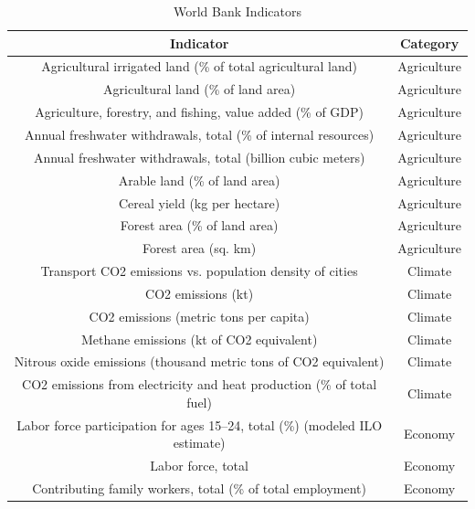     \begin{longtable}{||c|c||}
        \caption{World Bank Indicators}
        \label{tab:WDI Indicators}
        \\\hline
        \textbf{Indicator} & \textbf{Category} \\


        \hline
            Agricultural irrigated land (\% of total agricultural land)
 & Agriculture 
\\
        \hline
            Agricultural land (\% of land area)
 & Agriculture 
\\
        \hline
            Agriculture, forestry, and fishing, value added (\% of GDP) & Agriculture\\
        \hline
            Annual freshwater withdrawals, total (\% of internal resources) & Agriculture \\
        \hline
            Annual freshwater withdrawals, total (billion cubic meters) & Agriculture \\
        \hline
            Arable land (\% of land area)  & Agriculture\\
        \hline
            Cereal yield (kg per hectare) & Agriculture \\
        \hline
            Forest area (\% of land area) & Agriculture \\
        \hline
            Forest area (sq. km) & Agriculture \\
        \hline
            Transport CO2 emissions vs. population density of cities & Climate \\
        \hline
            CO2 emissions (kt) & Climate \\
        \hline
            CO2 emissions (metric tons per capita) & Climate \\
        \hline
            Methane emissions (kt of CO2 equivalent) & Climate\\
        \hline
            Nitrous oxide emissions (thousand metric tons of CO2 equivalent) & Climate \\
        \hline
            CO2 emissions from electricity and heat production (\% of total fuel) & Climate \\
        \hline
            Labor force participation for ages 15–24, total (\%) (modeled ILO estimate) & Economy \\
        \hline
            Labor force, total & Economy \\
        \hline
            Contributing family workers, total (\% of total employment) & Economy \\

\end{longtable}
